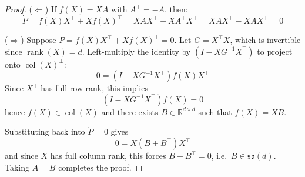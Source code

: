 \documentclass[10pt,a4paper]{amsart}
\newcommand{\RR}{\mathbb{R}}
\DeclareMathOperator{\col}{col}
\DeclareMathOperator{\rank}{rank}
\newcommand{\so}{\mathfrak{so}}
\begin{document}
\begin{proof}
($\Leftarrow$) If $f(X) = XA$ with $A^\top = -A$, then:
\begin{equation}
\dot{P} = f(X) X^\top + X f(X)^\top = XAX^\top + XA^\top X^\top = XAX^\top - XAX^\top = 0
\end{equation}

($\Rightarrow$) Suppose $\dot{P} = f(X) X^\top + X f(X)^\top = 0$.
Let $G = X^\top X$, which is invertible since $\rank(X)=d$.
Left-multiply the identity by $(I - XG^{-1}X^\top)$ to project onto $\col(X)^\perp$:
\begin{equation}
0 = (I - XG^{-1}X^\top) f(X) X^\top
\end{equation}
Since $X^\top$ has full row rank, this implies
\begin{equation}
(I - XG^{-1}X^\top) f(X) = 0
\end{equation}
hence $f(X) \in \col(X)$ and there exists $B \in \RR^{d \times d}$ such that $f(X) = XB$.

Substituting back into $\dot{P}=0$ gives
\begin{equation}
0 = X(B + B^\top) X^\top
\end{equation}
and since $X$ has full column rank, this forces $B + B^\top = 0$, i.e.\ $B \in \so(d)$.
Taking $A = B$ completes the proof.
\end{proof}
\end{document}
